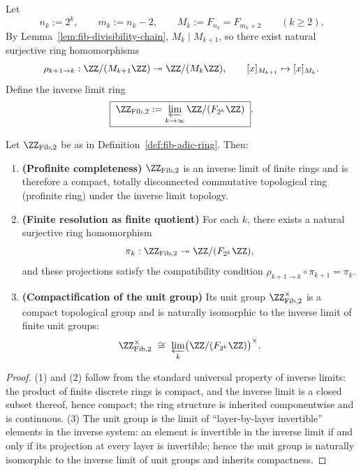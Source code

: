 \begin{definition}\label{def:fib-adic-ring}
Let
\[
n_k:=2^k,\qquad m_k:=n_k-2,\qquad M_k:=F_{n_k}=F_{m_k+2}\qquad(k\ge 2).
\]
By Lemma~\ref{lem:fib-divisibility-chain}, $M_k\mid M_{k+1}$, so there exist natural surjective ring homomorphisms
\[
\rho_{k+1\to k}:\ZZ/(M_{k+1}\ZZ)\twoheadrightarrow \ZZ/(M_k\ZZ),
\qquad [x]_{M_{k+1}}\mapsto [x]_{M_k}.
\]
Define the inverse limit ring
\[
\boxed{\;
\ZZ_{\mathrm{Fib},2}:=\varprojlim_{k\to\infty}\ZZ/(F_{2^k}\ZZ)
\;}.
\]
\end{definition}

\begin{proposition}\label{prop:fib-adic-basic}
Let $\ZZ_{\mathrm{Fib},2}$ be as in Definition~\ref{def:fib-adic-ring}.
Then:
\begin{enumerate}
  \item \textbf{(Profinite completeness)} $\ZZ_{\mathrm{Fib},2}$ is an inverse limit of finite rings and is therefore a compact, totally disconnected commutative topological ring (profinite ring) under the inverse limit topology.
  \item \textbf{(Finite resolution as finite quotient)} For each $k$, there exists a natural surjective ring homomorphism
  \[
  \pi_k:\ZZ_{\mathrm{Fib},2}\twoheadrightarrow \ZZ/(F_{2^k}\ZZ),
  \]
  and these projections satisfy the compatibility condition $\rho_{k+1\to k}\circ \pi_{k+1}=\pi_k$.
  \item \textbf{(Compactification of the unit group)} Its unit group $\ZZ_{\mathrm{Fib},2}^\times$ is a compact topological group and is naturally isomorphic to the inverse limit of finite unit groups:
  \[
  \ZZ_{\mathrm{Fib},2}^\times\ \cong\ \varprojlim_k \bigl(\ZZ/(F_{2^k}\ZZ)\bigr)^\times.
  \]
\end{enumerate}
\end{proposition}
\begin{proof}
(1) and (2) follow from the standard universal property of inverse limits: the product of finite discrete rings is compact, and the inverse limit is a closed subset thereof, hence compact; the ring structure is inherited componentwise and is continuous.
(3) The unit group is the limit of ``layer-by-layer invertible'' elements in the inverse system: an element is invertible in the inverse limit if and only if its projection at every layer is invertible; hence the unit group is naturally isomorphic to the inverse limit of unit groups and inherits compactness.
\end{proof}

